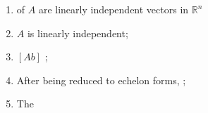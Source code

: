 \begin{enumerate}
\begin{enumerate}
      \item {} of $ A $ are 
      linearly independent vectors in $ \mathbb{R}^{n} $
      
      \item $ A $ is linearly independent;
      
      \item $ \left[ A b \right] $ ;
      
      \item After being reduced to echelon forms, 
      ;
      
      \item The 
    \end{enumerate}
  \end{enumerate}